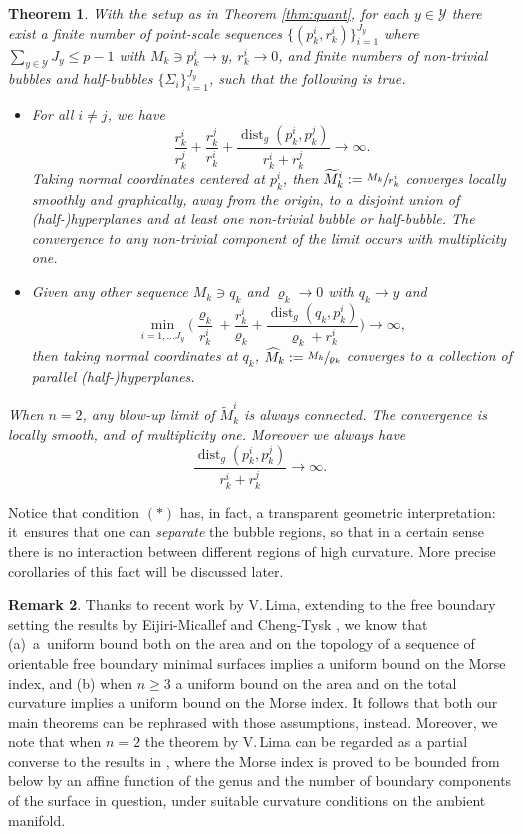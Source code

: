\documentclass[10pt]{amsart}
\let\mathcal\mathscr
\DeclareMathOperator{\dist}{dist}
\newtheorem{thm}{Theorem}
\theoremstyle{definition}
\newtheorem{rmk}[thm]{Remark}
\begin{document}
\begin{thm}\label{thm:bubbles}
With the setup as in Theorem \ref{thm:quant}, for each $y\in \mathcal{Y}$ there exist a \hbox{finite} number of point-scale sequences $\{(p^i_k, r^i_k)\}_{i=1}^{J_y}$ where $\sum_{y\in \mathcal{Y}} J_y \leq p-1$ with \hbox{$M_k \ni p^i_k \to y$}, $r^i_k\to 0$, and finite numbers of non-trivial bubbles and half-bubbles $\{\Sigma_i\}_{i=1}^{J_y}$, such that the following is true.
\begin{itemize}
\item For all $i\neq j$, we have
\begin{equation*}
\frac{r^i_k}{r^j_k} + \frac{r^j_k}{r^i_k} + \frac{\dist_g(p^i_k, p^j_k)}{r^i_k + r^j_k} \to \infty.
\end{equation*}
Taking normal coordinates centered at $p^i_k$, then $\widetilde{M}^i_k:=\sfrac{M_k}{r^i_k}$ converges \hbox{locally} smoothly and graphically, away from the origin, to a disjoint union of \hbox{(half-)}hyper\-planes and at least one non-trivial bubble or half-bubble. The convergence to any non-trivial component of the limit occurs with multiplicity one.
\item Given any other sequence $M_k \ni q_k$ and $\varrho_k \to 0$ with $q_k \to y$ and
\begin{equation*}
\min_{i=1,\dots J_y} \Big(\frac{\varrho_k}{r^i_k} + \frac{r^i_k}{\varrho_k} + \frac{\dist_g(q_k,p^i_k)}{\varrho_k + r^i_k}\Big)\to \infty,
\end{equation*}
then taking normal coordinates at $q_k$, $\widehat{M}_k:= \sfrac{M_k}{\varrho_k}$ converges to a collection of parallel (half-)hyperplanes.
\end{itemize}
When $n=2$, any blow-up limit of $\widetilde{M}^i_k$ is always connected. The convergence is locally smooth, and of multiplicity one. Moreover we always have
\[
\tag{$*$}
\frac{\dist_g(p^i_k,p^j_k)}{r^i_k + r^j_k}\to \infty .
\]
\end{thm}
Notice that condition $(*)$ has, in fact, a transparent geometric interpretation: it~ensures that one can \emph{separate} the bubble regions, so that in a certain sense there is no interaction between different regions of high curvature. More precise corollaries of this fact will be discussed later.

\begin{rmk}\label{rem:lima}
Thanks to recent work \cite{Lim17} by V.\,Lima, extending to the free boundary setting the results by Eijiri-Micallef \cite{EM08} and Cheng-Tysk \cite{CT94}, we know that (a)~a~uniform bound both on the area and on the topology of a sequence of orientable free boundary minimal surfaces implies a uniform bound on the Morse index, and (b) when $n\geq 3$ a uniform bound on the area and on the total curvature implies a uniform bound on the Morse index. It follows that both our main theorems can be rephrased with those assumptions, instead. Moreover, we note that when $n=2$ the theorem by V.\,Lima can be regarded as a partial converse to the results in \cite{ACS18b}, where the Morse index is proved to be bounded from below by an affine function of the genus and the number of boundary components of the surface in question, under suitable curvature conditions on the ambient manifold.
\end{rmk}
\end{document}
